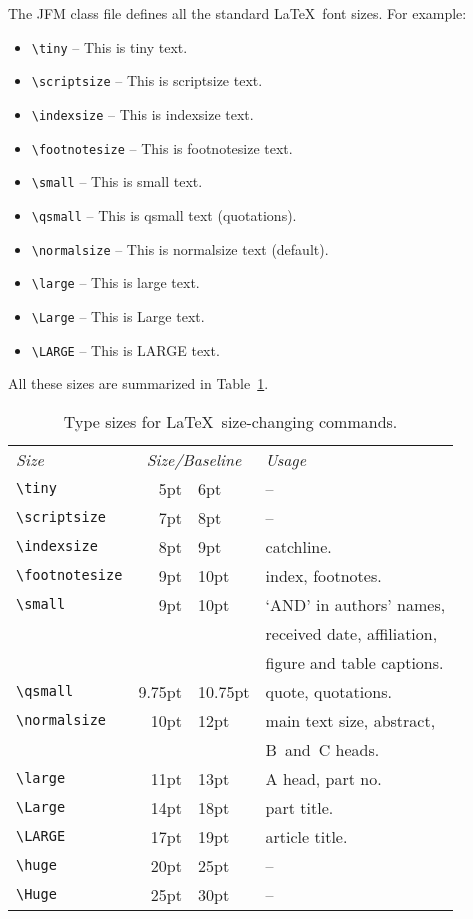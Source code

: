 \documentclass{jfm}
\begin{document}
The JFM class file defines all the standard \LaTeX\ font sizes. For example:
\begin{itemize}
  \item \verb"\tiny" -- {\tiny This is tiny text.}
  \item \verb"\scriptsize" -- {\scriptsize This is scriptsize text.}
  \item \verb"\indexsize" -- {\indexsize This is indexsize text.}
  \item \verb"\footnotesize" -- {\footnotesize This is footnotesize text.}
  \item \verb"\small" -- {\small This is small text.}
  \item \verb"\qsmall"  -- {\qsmall This is qsmall text (quotations).}
  \item \verb"\normalsize" -- This is normalsize text (default).
  \item \verb"\large" -- {\large This is large text.}
  \item \verb"\Large" -- {\Large This is Large text.}
  \item \verb"\LARGE" -- {\LARGE This is LARGE text.}
\end{itemize}
%
All these sizes are summarized in Table~\ref{tab:fontsizes}.
%
\begin{table}
 \begin{center}
 \begin{tabular}{@{}lr@{/}lp{4cm}@{}}
 \multicolumn{1}{l}{\textit{Size}} &
  \multicolumn{2}{c}{\textit{Size/Baseline}} & \textit{Usage}\\[3pt]
 \verb"\tiny"         &     5pt &  6pt    & --\\
 \verb"\scriptsize"   &     7pt &  8pt    & --\\
 \verb"\indexsize"    &     8pt &  9pt    & catchline.\\
 \verb"\footnotesize" &     9pt & 10pt    & index, footnotes.\\
 \verb"\small"        &     9pt & 10pt    & `AND' in authors' names,\\
                      &         &         & received date, affiliation,\\
                      &         &         & figure and table captions.\\
 \verb"\qsmall"       &  9.75pt & 10.75pt & quote, quotations.\\
 \verb"\normalsize"   &    10pt & 12pt    & main text size, abstract,\\
                      &         &         & B~and~C heads.\\
 \verb"\large"        &    11pt & 13pt    & A head, part no.\\
 \verb"\Large"        &    14pt & 18pt    & part title.\\
 \verb"\LARGE"        &    17pt & 19pt    & article title.\\
 \verb"\huge"         &    20pt & 25pt    & --\\
 \verb"\Huge"         &    25pt & 30pt    & --\\
 \end{tabular}
\caption{Type sizes for \LaTeX\ size-changing commands.}
\label{tab:fontsizes}
\end{center}
\end{table}
\end{document}
